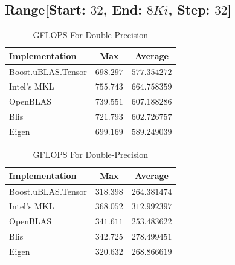 \clearpage
\subsection*{Range[Start: $32$, End: $8Ki$, Step: $32$]}

\begin{table}[ht]
    \centering
    \caption{GFLOPS For Single-Precision}
    \begin{tabular}{|l|c|c|}
        \hline
        \textbf{Implementation} & \textbf{Max} & \textbf{Average}\\
        \hline
        Boost.uBLAS.Tensor  & $698.297$& $577.354272$ \\
        \hline
        Intel's MKL         & $755.743$& $664.758359$ \\
        \hline
        OpenBLAS            & $739.551$& $607.188286$ \\
        \hline
        Blis                & $721.793$& $602.726757$ \\
        \hline
        Eigen               & $699.169$& $589.249039$ \\
        \hline
    \end{tabular}

    \vspace*{1 cm}

    \centering
    \caption{GFLOPS For Double-Precision}
    \begin{tabular}{|l|c|c|}
        \hline
        \textbf{Implementation} & \textbf{Max} & \textbf{Average}\\
        \hline
        Boost.uBLAS.Tensor  & $318.398$& $264.381474$ \\
        \hline
        Intel's MKL         & $368.052$& $312.992397$ \\
        \hline
        OpenBLAS            & $341.611$& $253.483622$ \\
        \hline
        Blis                & $342.725$& $278.499451$ \\
        \hline
        Eigen               & $320.632$& $268.866619$ \\
        \hline
    \end{tabular}
\end{table}

